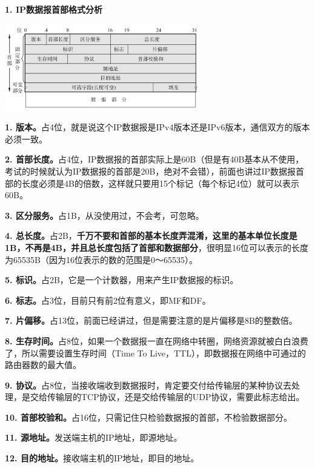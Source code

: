 {\textbf{{1. IP数据报首部格式分析}}}

\includegraphics[width=3.33333in,height=1.47917in]{png-jpeg-pics/A9081B07899EF05DB05E89AD0FA5206C.png}

\textbf{1.
版本。}占4位，就是说这个IP数据报是IPv4版本还是IPv6版本，通信双方的版本必须一致。

\textbf{2.
首部长度。}占4位，IP数据报的首部实际上是60B（但是有40B基本从不使用，考试的时候就认为IP数据报的首部是20B，绝对不会错），前面也讲过IP数据报首部的长度必须是4B的倍数，这样就只要用15个标记（每个标记4位）就可以表示60B。

\textbf{3. 区分服务。}占1B，从没使用过，不会考，可忽略。

\textbf{4.
总长度。}占2B，{\textbf{千万不要和首部的基本长度弄混淆，这里的基本单位长度是1B，不再是4B，并且总长度包括了首部和数据部分}}，很明显16位可以表示的长度为65535B（因为16位表示的数的范围是0～65535）。

\textbf{5. 标识。}占2B，它是一个计数器，用来产生IP数据报的标识。

\textbf{6. 标志。}占3位，目前只有前2位有意义，即MF和DF。

\textbf{7.
片偏移。}占13位，前面已经讲过，但是需要注意的是片偏移是8B的整数倍。

\textbf{8.
生存时间。}占8位，如果一个数据报一直在网络中转圈，网络资源就被白白浪费了，所以需要设置生存时间（Time
To Live，TTL），即数据报在网络中可通过的路由器数的最大值。

\textbf{9.
协议。}占8位，当接收端收到数据报时，肯定要交付给传输层的某种协议去处理，是交给传输层的TCP协议，还是交给传输层的UDP协议，需要此标志给出。

\textbf{10.
首部校验和。}占16位，只需记住只检验数据报的首部，不检验数据部分。

\textbf{11. 源地址。}发送端主机的IP地址，即源地址。

\textbf{12. 目的地址。}接收端主机的IP地址，即目的地址。
